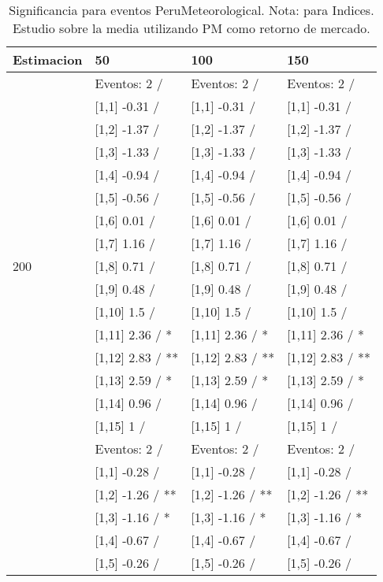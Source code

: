 \begin{table}

\caption{Significancia para eventos PeruMeteorological. Nota: para Indices. Estudio sobre la media utilizando PM como retorno de mercado.}
\centering
\begin{tabular}[t]{llll}
\toprule
Estimacion & 50 & 100 & 150\\
\midrule
 & Eventos:  2 / & Eventos:  2 / & Eventos:  2 /\\
 & {}[1,1] -0.31  / & {}[1,1] -0.31  / & {}[1,1] -0.31  /\\
 & {}[1,2] -1.37  / & {}[1,2] -1.37  / & {}[1,2] -1.37  /\\
 & {}[1,3] -1.33  / & {}[1,3] -1.33  / & {}[1,3] -1.33  /\\
 & {}[1,4] -0.94  / & {}[1,4] -0.94  / & {}[1,4] -0.94  /\\
\addlinespace
 & {}[1,5] -0.56  / & {}[1,5] -0.56  / & {}[1,5] -0.56  /\\
 & {}[1,6] 0.01  / & {}[1,6] 0.01  / & {}[1,6] 0.01  /\\
 & {}[1,7] 1.16  / & {}[1,7] 1.16  / & {}[1,7] 1.16  /\\
200 & {}[1,8] 0.71  / & {}[1,8] 0.71  / & {}[1,8] 0.71  /\\
 & {}[1,9] 0.48  / & {}[1,9] 0.48  / & {}[1,9] 0.48  /\\
\addlinespace
 & {}[1,10] 1.5  / & {}[1,10] 1.5  / & {}[1,10] 1.5  /\\
 & {}[1,11] 2.36  / * & {}[1,11] 2.36  / * & {}[1,11] 2.36  / *\\
 & {}[1,12] 2.83  / ** & {}[1,12] 2.83  / ** & {}[1,12] 2.83  / **\\
 & {}[1,13] 2.59  / * & {}[1,13] 2.59  / * & {}[1,13] 2.59  / *\\
 & {}[1,14] 0.96  / & {}[1,14] 0.96  / & {}[1,14] 0.96  /\\
\addlinespace
 & {}[1,15] 1  / & {}[1,15] 1  / & {}[1,15] 1  /\\
 & Eventos:  2 / & Eventos:  2 / & Eventos:  2 /\\
 & {}[1,1] -0.28  / & {}[1,1] -0.28  / & {}[1,1] -0.28  /\\
 & {}[1,2] -1.26  / ** & {}[1,2] -1.26  / ** & {}[1,2] -1.26  / **\\
 & {}[1,3] -1.16  / * & {}[1,3] -1.16  / * & {}[1,3] -1.16  / *\\
\addlinespace
 & {}[1,4] -0.67  / & {}[1,4] -0.67  / & {}[1,4] -0.67  /\\
 & {}[1,5] -0.26  / & {}[1,5] -0.26  / & {}[1,5] -0.26  /\\

\end{tabular}
\end{table}
